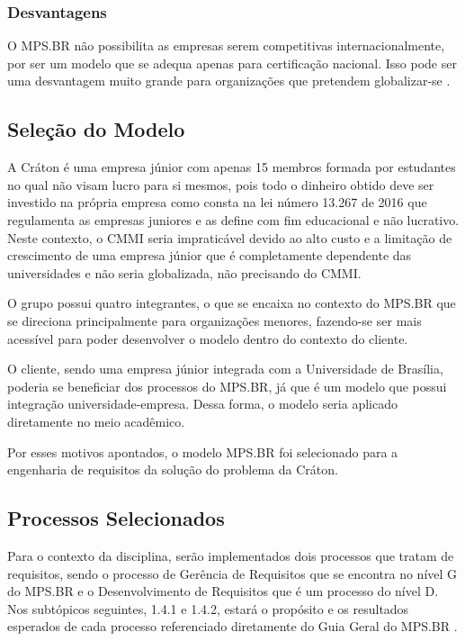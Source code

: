    \subsubsection{Desvantagens}

    O MPS.BR não possibilita as empresas serem competitivas internacionalmente,
    por ser um modelo que se adequa apenas para certificação nacional. Isso pode
    ser uma desvantagem muito grande para organizações que pretendem
    globalizar-se \cite{francis2012}.

  \subsection{Seleção do Modelo}

    A Cráton é uma empresa júnior com apenas 15 membros formada por estudantes no qual
    não visam lucro para si mesmos, pois todo o dinheiro obtido deve ser investido
    na própria empresa como consta na lei número 13.267 de 2016 que regulamenta as empresas
    juniores e as define com fim educacional e não lucrativo. Neste contexto, o CMMI seria
    impraticável devido ao alto custo e a limitação de crescimento de uma empresa júnior que é
    completamente dependente das universidades e não seria globalizada, não precisando do CMMI.

    O grupo possui quatro integrantes, o que se encaixa no contexto do MPS.BR que se direciona
    principalmente para organizações menores, fazendo-se ser mais acessível para poder desenvolver
    o modelo dentro do contexto do cliente.

    O cliente, sendo uma empresa júnior integrada com a Universidade de Brasília, poderia se
    beneficiar dos processos do MPS.BR, já que é um modelo que possui integração universidade-empresa.
    Dessa forma, o modelo seria aplicado diretamente no meio acadêmico.

    Por esses motivos apontados, o modelo MPS.BR foi selecionado para a engenharia de requisitos da
    solução do problema da Cráton.

  \subsection{Processos Selecionados}

  Para o contexto da disciplina, serão implementados dois processos que tratam de
  requisitos, sendo o processo de Gerência de Requisitos que se encontra no nível
  G do MPS.BR e o Desenvolvimento de Requisitos que é um processo do nível D. Nos
  subtópicos seguintes, 1.4.1 e 1.4.2, estará o propósito e os resultados esperados
  de cada processo referenciado diretamente do Guia Geral do MPS.BR \cite{softexmps}.

